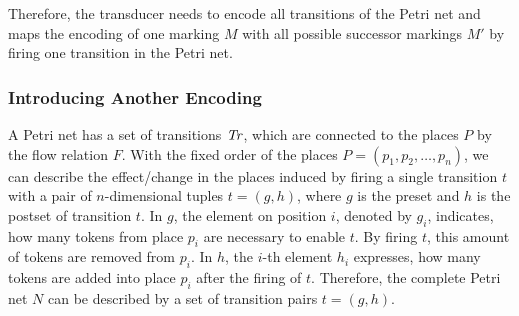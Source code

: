 

Therefore, the transducer needs to encode all transitions of the Petri net and maps the encoding of one marking $M$ with all possible successor markings $M'$ by firing one transition in the Petri net.


\subsubsection{Introducing Another Encoding}
A Petri net has a set of transitions $\mathit{Tr}$, which are connected to the places $P$ by the flow relation $F$. 
With the fixed order of the places $P = (p_{1},p_{2},\dots,p_{n})$, we can describe the effect/change in the places induced by firing a single transition $t$ with a pair of $n$-dimensional tuples $t = (g,h)$, where $g$ is the preset and $h$ is the postset of transition $t$. In $g$, the element on position $i$, denoted by $g_{i}$, indicates, how many tokens from place $p_{i}$ are necessary to enable $t$. By firing $t$, this amount of tokens are removed from $p_{i}$. In $h$, the $i$-th element $h_{i}$ expresses, how many tokens are added into place $p_{i}$ after the firing of $t$. Therefore, the complete Petri net $N$ can be described by a set of transition pairs $t = (g,h)$. 

% 
% 
%    
%
%
%
%
%
%



